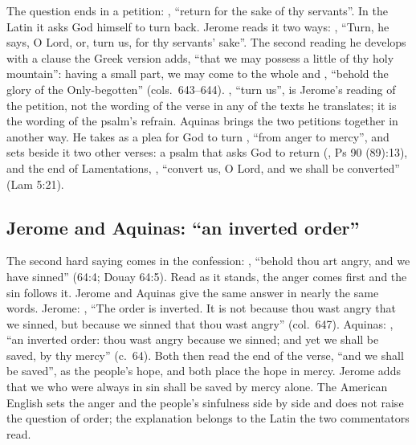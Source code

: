 The question ends in a petition: ,
``return for the sake of thy servants''. In the Latin it asks God himself to
turn back. Jerome reads it two ways: , ``Turn, he says, O Lord, or, turn us, for
thy servants' sake''. The second reading he develops with a clause the Greek
version adds, ``that we may possess a little of thy holy mountain'': having a
small part, we may come to the whole and , ``behold the glory of the Only-begotten'' (cols.~643--644).
, ``turn us'', is Jerome's reading of the petition, not the
wording of the verse in any of the texts he translates; it is the wording of
the psalm's refrain. Aquinas brings the two petitions together in another way. He takes
 as a plea for God to turn ,
``from anger to mercy'', and sets beside it two other verses: a psalm that
asks God to return (, Ps 90 (89):13), and the end
of Lamentations, , ``convert us,
O Lord, and we shall be converted'' (Lam 5:21).

\subsection{Jerome and Aquinas: ``an inverted order''}

The second hard saying comes in the confession: , ``behold thou art angry, and we have sinned'' (64:4; Douay
64:5). Read as it stands, the anger comes first and the sin follows it. Jerome
and Aquinas give the same answer in nearly the same words. Jerome: , ``The order is inverted. It is not because thou wast angry that
we sinned, but because we sinned that thou wast angry'' (col.~647). Aquinas:
, ``an inverted order: thou wast angry because we sinned;
and yet we shall be saved, by thy mercy'' (c.~64). Both then read the end of
the verse, ``and we shall be saved'', as the people's hope, and both place the
hope in mercy. Jerome adds that we who were always in sin shall be saved by
mercy alone. The American English sets the anger and the people's sinfulness
side by side and does not raise the question of order; the explanation
belongs to the Latin the two commentators read.

